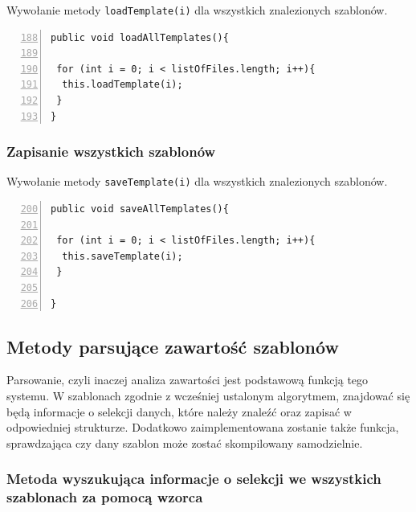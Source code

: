 Wywołanie metody \texttt{loadTemplate(i)} dla wszystkich znalezionych szablonów.

 \begin{lstlisting}[numbers=left,firstnumber=188]
public void loadAllTemplates(){
      
 for (int i = 0; i < listOfFiles.length; i++){
  this.loadTemplate(i);
 }
}
\end{lstlisting}

\subsubsection*{Zapisanie wszystkich szablonów}

Wywołanie metody \texttt{saveTemplate(i)} dla wszystkich znalezionych szablonów.

 \begin{lstlisting}[numbers=left,firstnumber=200]
public void saveAllTemplates(){
      
 for (int i = 0; i < listOfFiles.length; i++){
  this.saveTemplate(i);
 }
       
}
\end{lstlisting}

\subsection{Metody parsujące zawartość szablonów}

Parsowanie, czyli inaczej analiza zawartości jest podstawową funkcją tego systemu. W szablonach zgodnie z wcześniej ustalonym algorytmem, znajdować się będą informacje o selekcji danych, które należy znaleźć oraz zapisać w odpowiedniej strukturze. Dodatkowo zaimplementowana zostanie także funkcja, sprawdzająca czy dany szablon może zostać skompilowany samodzielnie. 

\subsubsection*{Metoda wyszukująca informacje o selekcji we wszystkich szablonach za pomocą wzorca}

